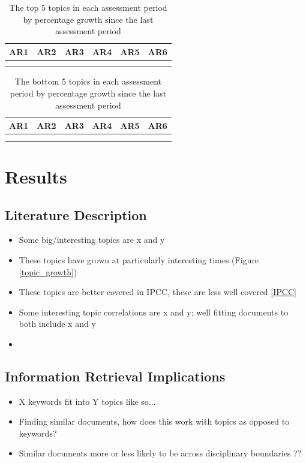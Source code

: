 \documentclass{article}
\begin{document}
\begin{table}
\small
\setlength\tabcolsep{0.1cm}
\begin{tabular}{cccccc}
AR1 & AR2 & AR3 & AR4 & AR5 & AR6 \\
\midrule \\
 &   & 
 &   &   & 
\end{tabular}
\caption{The top 5 topics in each assessment period by percentage growth since the last assessment period}
\end{table}

\begin{table}
\small
\setlength\tabcolsep{0.1cm}
\begin{tabular}{cccccc}
AR1 & AR2 & AR3 & AR4 & AR5 & AR6 \\
\midrule \\
 &   & 
 &   &   & 
\end{tabular}
\caption{The bottom 5 topics in each assessment period by percentage growth since the last assessment period}
\end{table}


\section*{Results}
\subsection*{Literature Description}
\begin{itemize}
	\item Some big/interesting topics are x and y
	\item These topics have grown at particularly interesting times (Figure \ref{topic_growth})
    \item These topics are better covered in IPCC, these are less well covered \ref{IPCC}
    \item Some interesting topic correlations are x and y; well fitting documents to both include x and y
    \item
\end{itemize}

\subsection*{Information Retrieval Implications}
\begin{itemize}
    \item X keywords fit into Y topics like so...
    \item Finding similar documents, how does this work with topics as opposed to keywords?
    \item Similar documents more or less likely to be across disciplinary boundaries ??
\end{itemize}
\end{document}
